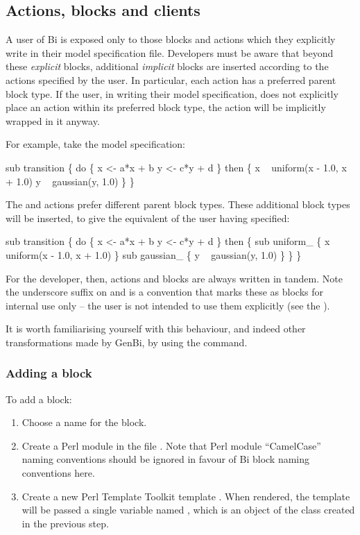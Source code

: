 \subsection{Actions, blocks and clients}

A user of Bi is exposed only to those blocks and actions which they explicitly
write in their model specification file. Developers must be aware that beyond
these \textit{explicit} blocks, additional \textit{implicit} blocks are
inserted according to the actions specified by the user. In particular, each
action has a preferred parent block type. If the user, in writing their model
specification, does not explicitly place an action within its
preferred block type, the action will be implicitly wrapped in it anyway.

For example, take the model specification:
\begin{bicode}
sub transition \{
  do \{
    x <- a*x + b
    y <- c*y + d
  \} then \{
    x ~ uniform(x - 1.0, x + 1.0)
    y ~ gaussian(y, 1.0)
  \}
\}
\end{bicode}
The  and  actions prefer different
parent block types. These additional block types will be inserted, to give the
equivalent of the user having specified:
\begin{bicode}
sub transition \{
  do \{
    x <- a*x + b
    y <- c*y + d
  \} then \{
    sub uniform_ \{
      x ~ uniform(x - 1.0, x + 1.0)
    \}
    sub gaussian_ \{
      y ~ gaussian(y, 1.0)
    \}
  \}  
\}
\end{bicode}

For the developer, then, actions and blocks are always written in tandem.
Note the underscore suffix on  and  is a
convention that marks these as blocks for internal use only -- the user is not
intended to use them explicitly (see the ).

It is worth familiarising yourself with this behaviour, and indeed other
transformations made by GenBi, by using the  command.

\subsubsection{Adding a block}

To add a block:
\begin{enumerate}
\item Choose a name for the block.
\item Create a Perl module  in the
  file . Note that Perl module
  ``CamelCase'' naming conventions should be ignored in favour of Bi block
  naming conventions here.
\item Create a new Perl Template Toolkit template
  . When rendered, the template
  will be passed a single variable named , which is an object of
  the class created in the previous step.
\end{enumerate}

